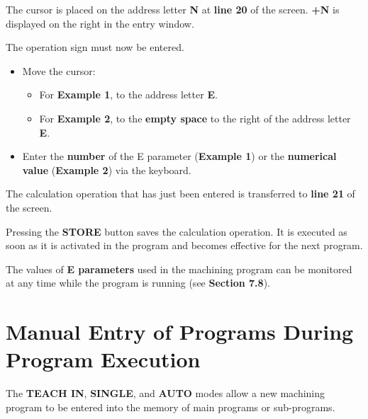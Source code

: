 The cursor is placed on the address letter \textbf{N} at \textbf{line 20} of the screen. \textbf{+N} is displayed on the right in the entry window.

The operation sign must now be entered.

\begin{itemize}
    \item Move the cursor:
    \begin{itemize}
        \item For \textbf{Example 1}, to the address letter \textbf{E}.
        \item For \textbf{Example 2}, to the \textbf{empty space} to the right of the address letter \textbf{E}.
    \end{itemize}
    \vspace{.5cm}
    \item Enter the \textbf{number} of the E parameter (\textbf{Example 1}) or the \textbf{numerical value} (\textbf{Example 2}) via the keyboard.
\end{itemize}

The calculation operation that has just been entered is transferred to \textbf{line 21} of the screen.

\begin{itemize}
\end{itemize}

Pressing the \textbf{STORE} button saves the calculation operation. It is executed as soon as it is activated in the program and becomes effective for the next program.

\notes

The values of \textbf{E parameters} used in the machining program can be monitored at any time while the program is running (see \textbf{Section 7.8}).

\newpage

\section{Manual Entry of Programs During Program Execution}

The \textbf{TEACH IN}, \textbf{SINGLE}, and \textbf{AUTO} modes allow a new machining program to be entered into the memory of main programs or sub-programs.

